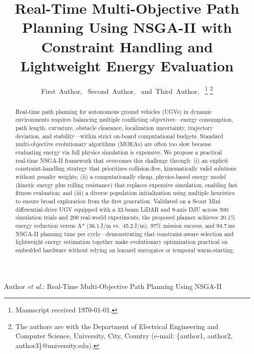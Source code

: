 \documentclass[lettersize,journal]{IEEEtran}
\begin{document}
\title{Real-Time Multi-Objective Path Planning Using NSGA-II with Constraint Handling and Lightweight Energy Evaluation}

\author{First~Author,~
        Second~Author,~
        and~Third~Author,~%
\thanks{Manuscript received \today.}%
\thanks{The authors are with the Department of Electrical Engineering and Computer
Science, University, City, Country (e-mail: \{author1, author2, author3\}@university.edu).}}

%
{Author \MakeLowercase{\textit{et al.}}: Real-Time Multi-Objective Path Planning Using NSGA-II}

\maketitle

\begin{abstract}
Real‑time path planning for autonomous ground vehicles (UGVs) in dynamic
environments requires balancing multiple conflicting objectives—energy
consumption, path length, curvature, obstacle clearance, localization
uncertainty, trajectory deviation, and stability—within strict on‑board
computational budgets. Standard multi‑objective evolutionary algorithms (MOEAs)
are often too slow because evaluating energy via full physics simulation is
expensive. We propose a practical real‑time NSGA‑II framework that overcomes
this challenge through: (i) an explicit constraint‑handling strategy that
prioritizes collision‑free, kinematically valid solutions without penalty
weights; (ii) a computationally cheap, physics‑based energy model (kinetic
energy plus rolling resistance) that replaces expensive simulation, enabling
fast fitness evaluation; and (iii) a diverse population initialization using
multiple heuristics to ensure broad exploration from the first generation.
Validated on a Scout Mini differential‑drive UGV equipped with a 32‑beam LiDAR
and 9‑axis IMU across 500 simulation trials and 200 real‑world experiments,
the proposed planner achieves 20.1\% energy reduction versus A*
(36.1\,J/m vs.\ 45.2\,J/m), 97\% mission success, and 94.7\,ms NSGA‑II
planning time per cycle—demonstrating that constraint‑aware selection and
lightweight energy estimation together make evolutionary optimization
practical on embedded hardware without relying on learned surrogates or
temporal warm‑starting.
\end{abstract}
\end{document}
